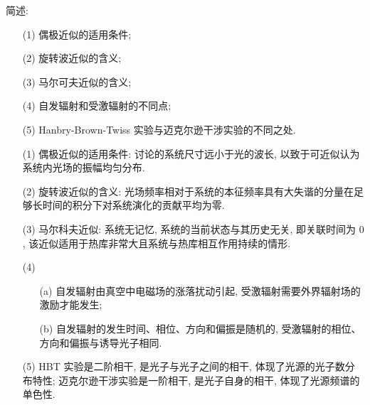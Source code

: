 \documentclass{assignment}
\begin{document}
\begin{prob}
    简述:
    \begin{itemize}
        \item[(1)] 偶极近似的适用条件;
        \item[(2)] 旋转波近似的含义;
        \item[(3)] 马尔可夫近似的含义;
        \item[(4)] 自发辐射和受激辐射的不同点;
        \item[(5)] Hanbry-Brown-Twiss 实验与迈克尔逊干涉实验的不同之处.
    \end{itemize}
\end{prob}
\begin{sol}
    \begin{itemize}
        \item[(1)] 偶极近似的适用条件: 讨论的系统尺寸远小于光的波长, 以致于可近似认为系统内光场的振幅均匀分布.
        \item[(2)] 旋转波近似的含义: 光场频率相对于系统的本征频率具有大失谐的分量在足够长时间的积分下对系统演化的贡献平均为零.
        \item[(3)] 马尔科夫近似: 系统无记忆, 系统的当前状态与其历史无关, 即关联时间为 $0$, 该近似适用于热库非常大且系统与热库相互作用持续的情形.
        \item[(4)] 
        \begin{itemize}
            \item[(a)] 自发辐射由真空中电磁场的涨落扰动引起, 受激辐射需要外界辐射场的激励才能发生;
            \item[(b)] 自发辐射的发生时间、相位、方向和偏振是随机的, 受激辐射的相位、方向和偏振与诱导光子相同.
        \end{itemize}
        \item[(5)] HBT 实验是二阶相干, 是光子与光子之间的相干, 体现了光源的光子数分布特性; 迈克尔逊干涉实验是一阶相干, 是光子自身的相干, 体现了光源频谱的单色性.
    \end{itemize}
\end{sol}
\end{document}
